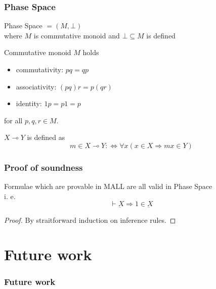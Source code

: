 \documentclass[dvipdfmx,cjk]{beamer}
\theoremstyle{example}
\begin{document}
\begin{frame}
  \frametitle{Phase Space}

  \begin{definition}{Phase Space $ = (M, \bot) $} \\
    where $M$ is commutative monoid and $\bot \subseteq M$ is defined
  \end{definition}

  \begin{definition}{Commutative monoid $M$} holds \\
    \begin{itemize}
      \item commutativity: $pq = qp$
      \item associativity: $(pq)r = p(qr)$
      \item identity: $1p = p1 = p$
    \end{itemize}
    for all $p, q, r \in M$.
  \end{definition}

  \begin{definition}{$X \multimap Y$}
    is defined as 
    \[
      m \in X \multimap Y 
      :\Leftrightarrow \forall x (x \in X \Rightarrow mx \in Y)
    \] 
  \end{definition}
  
\end{frame}

\begin{frame}
  \frametitle{Proof of soundness}
  \begin{theorem}
    Formulae which are provable in MALL are all valid in Phase Space \\
    i. e. \[
        \vdash \underbar{X} \Rightarrow 1 \in \underbar{X}
    \]
        
  \end{theorem}

  \begin{proof}
    By straitforward induction on inference rules.
  \end{proof}
  
\end{frame}

\section{Future work}

\begin{frame}
  \frametitle{Future work}

\end{frame}
                          
\end{document}
